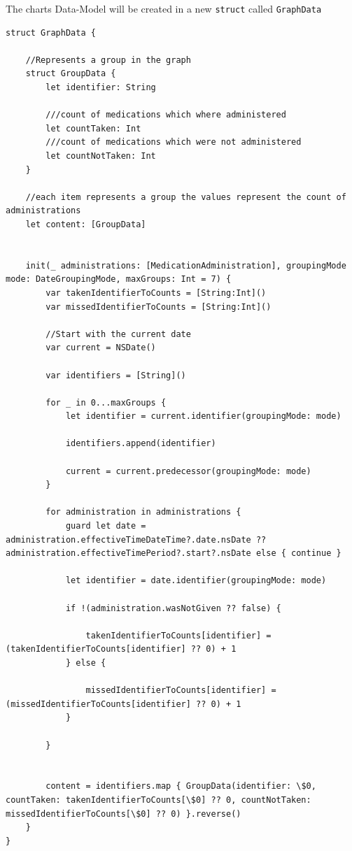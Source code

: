 \documentclass{article}
\begin{document}
The charts Data-Model will be created in a new \texttt{struct} called
\texttt{GraphData}

\begin{verbatim}
struct GraphData {

    //Represents a group in the graph
    struct GroupData {
        let identifier: String

        ///count of medications which where administered
        let countTaken: Int
        ///count of medications which were not administered
        let countNotTaken: Int
    }

    //each item represents a group the values represent the count of administrations
    let content: [GroupData]


    init(_ administrations: [MedicationAdministration], groupingMode mode: DateGroupingMode, maxGroups: Int = 7) {
        var takenIdentifierToCounts = [String:Int]()
        var missedIdentifierToCounts = [String:Int]()

        //Start with the current date
        var current = NSDate()

        var identifiers = [String]()

        for _ in 0...maxGroups {
            let identifier = current.identifier(groupingMode: mode)

            identifiers.append(identifier)

            current = current.predecessor(groupingMode: mode)
        }

        for administration in administrations {
            guard let date = administration.effectiveTimeDateTime?.date.nsDate ?? administration.effectiveTimePeriod?.start?.nsDate else { continue }

            let identifier = date.identifier(groupingMode: mode)

            if !(administration.wasNotGiven ?? false) {

                takenIdentifierToCounts[identifier] = (takenIdentifierToCounts[identifier] ?? 0) + 1
            } else {

                missedIdentifierToCounts[identifier] = (missedIdentifierToCounts[identifier] ?? 0) + 1
            }

        }


        content = identifiers.map { GroupData(identifier: \$0, countTaken: takenIdentifierToCounts[\$0] ?? 0, countNotTaken:  missedIdentifierToCounts[\$0] ?? 0) }.reverse()
    }
}
\end{verbatim}
\end{document}
